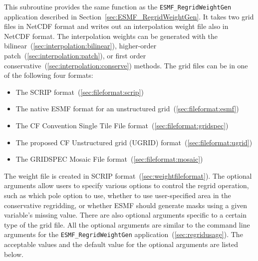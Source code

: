    This subroutine provides the same function as the {\tt ESMF\_RegridWeightGen} application
   described in Section~\ref{sec:ESMF_RegridWeightGen}.  It takes two grid files in NetCDF format and writes out an
   interpolation weight file also in NetCDF format.  The interpolation weights can be generated with the
   bilinear~(\ref{sec:interpolation:bilinear}), higher-order patch~(\ref{sec:interpolation:patch}),
   or first order conservative~(\ref{sec:interpolation:conserve}) methods.  The grid files can be in
   one of the following four formats:
   \begin{itemize}
   \item The SCRIP format~(\ref{sec:fileformat:scrip})
   \item The native ESMF format for an unstructured grid~(\ref{sec:fileformat:esmf})
   \item The CF Convention Single Tile File format~(\ref{sec:fileformat:gridspec})
   \item The proposed CF Unstructured grid (UGRID) format~(\ref{sec:fileformat:ugrid})
   \item The GRIDSPEC Mosaic File format~(\ref{sec:fileformat:mosaic})
   \end{itemize}
   \smallskip
   The weight file is created in SCRIP format~(\ref{sec:weightfileformat}).
   The optional arguments allow users to specify various options to control the regrid operation,
   such as which pole option to use,
   whether to use user-specified area in the conservative regridding, or whether ESMF should generate masks using a given
   variable's missing value.  There are also optional arguments specific to a certain type of the grid file.
   All the optional arguments are similar to the command line arguments for the {\tt ESMF\_RegridWeightGen}
   application~(\ref{sec:regridusage}). The acceptable values and the default value for the optional arguments
   are listed below.
  
